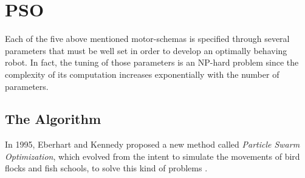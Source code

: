 \documentclass[journal]{IEEEtran}
\begin{document}
%





\section{PSO}
\label{sec:3}

Each of the five above mentioned motor-schemas is specified through several parameters that 
must be well set in order to develop an optimally behaving robot. In fact, the tuning of those 
parameters is an NP-hard problem since the complexity of its computation increases 
exponentially with the number of parameters.

\subsection{The Algorithm}
In 1995, Eberhart and Kennedy proposed a new method called \textit{Particle Swarm Optimization}, which evolved from the intent to simulate the movements of bird flocks and fish schools, to solve this kind of problems \cite{IEEEhowto:first_pso}. 
\end{document}
